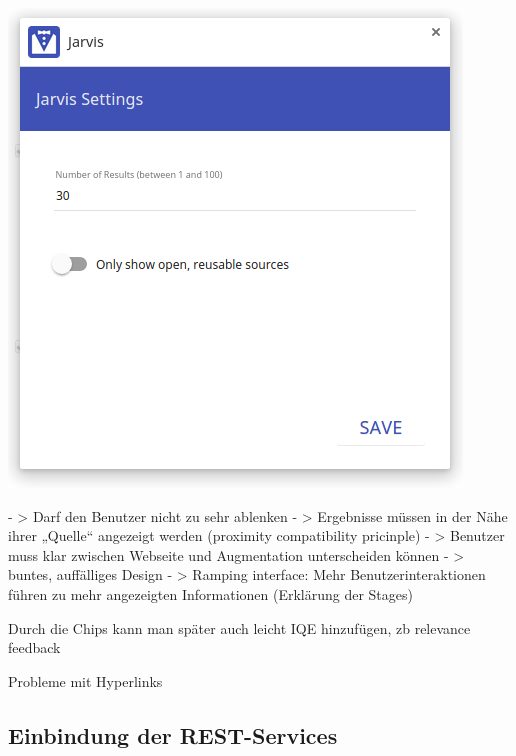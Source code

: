  \begin{minipage}{\linewidth}
	\centering
	\includegraphics[scale=0.5]{Bilder/app-screenshots/settings.png}
	\label{fig:settings}
 \end{minipage}

		- > Darf den Benutzer nicht zu sehr ablenken
		- > Ergebnisse müssen in der Nähe ihrer „Quelle“ angezeigt werden (proximity compatibility pricinple)
		- > Benutzer muss klar zwischen Webseite und Augmentation unterscheiden können
		- > buntes, auffälliges Design
		- > Ramping interface: Mehr Benutzerinteraktionen führen zu mehr angezeigten Informationen (Erklärung der Stages) 


 Durch die Chips kann man später auch leicht IQE hinzufügen, zb relevance feedback

 Probleme mit Hyperlinks
 \subsection{Einbindung der REST-Services}